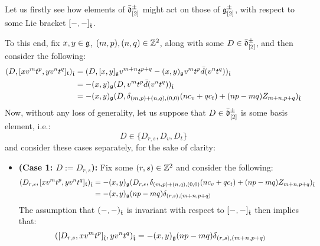             \begin{remark} \label{remark: derivation_action_on_loop_algebras}
                Let us firstly see how elements of $\bar{\mathfrak{d}}_{[2]}^{\pm}$ might act on those of $\mathfrak{g}_{[2]}^{\pm}$, with respect to some Lie bracket $[-, -]_{\hat{\mathfrak{t}}}$. 

                To this end, fix $x, y \in \mathfrak{g}$, $(m, p), (n, q) \in \mathbb{Z}^2$, along with some $D \in \bar{\mathfrak{d}}_{[2]}^{\pm}$, and then consider the following:
                    $$
                        \begin{aligned}
                            ( D, [x v^m t^p, y v^n t^q]_{\mathfrak{t}} )_{\hat{\mathfrak{t}}} & = ( D, [x, y]_{\mathfrak{g}} v^{m + n} t^{p + q} - (x, y)_{\mathfrak{g}} v^m t^p \bar{d}( v^n t^q ) )_{\hat{\mathfrak{t}}}
                            \\
                            & = -(x, y)_{\mathfrak{g}} ( D, v^m t^p \bar{d}( v^n t^q ) )_{\hat{\mathfrak{t}}}
                            \\
                            & = -(x, y)_{\mathfrak{g}} ( D, \delta_{(m, p) + (n, q), (0, 0)} ( n c_v + q c_t ) + (np - mq) Z_{m + n, p + q} )_{\hat{\mathfrak{t}}}
                        \end{aligned}
                    $$
                Now, without any loss of generality, let us suppose that $D \in \bar{\mathfrak{d}}_{[2]}^{\pm}$ is some basis element, i.e.:
                    $$D \in \{ D_{r, s}, D_v, D_t \}$$
                and consider these cases separately, for the sake of clarity:
                \begin{itemize}
                    \item \textbf{(Case 1: $D := D_{r, s}$):} Fix some $(r, s) \in \mathbb{Z}^2$ and consider the following:
                        $$
                            \begin{aligned}
                                ( D_{r, s}, [x v^m t^p, y v^n t^q]_{\mathfrak{t}} )_{\hat{\mathfrak{t}}} & = -(x, y)_{\mathfrak{g}} ( D_{r, s}, \delta_{(m, p) + (n, q), (0, 0)} ( n c_v + q c_t ) + (np - mq) Z_{m + n, p + q} )_{\hat{\mathfrak{t}}}
                                \\
                                & = -(x, y)_{\mathfrak{g}} (np - mq) \delta_{(r, s), (m + n, p + q)}
                            \end{aligned}
                        $$
                    The assumption that $(-, -)_{\hat{\mathfrak{t}}}$ is invariant with respect to $[-, -]_{\hat{\mathfrak{t}}}$ then implies that:
                        $$( [D_{r, s}, x v^m t^p]_{\hat{\mathfrak{t}}}, y v^n t^q )_{\hat{\mathfrak{t}}} = -(x, y)_{\mathfrak{g}} (np - mq) \delta_{(r, s), (m + n, p + q)}$$

\end{itemize}
\end{remark}
